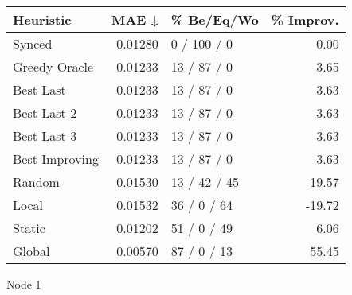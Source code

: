 \begin{tabular}{lrlr}
\toprule
\textbf{Heuristic} & \textbf{MAE ↓} & \textbf{\% Be/Eq/Wo} & \textbf{\% Improv.} \\
\midrule
            Synced &        0.01280 &          0 / 100 / 0 &                0.00 \\
     Greedy Oracle &        0.01233 &          13 / 87 / 0 &                3.65 \\
         Best Last &        0.01233 &          13 / 87 / 0 &                3.63 \\
       Best Last 2 &        0.01233 &          13 / 87 / 0 &                3.63 \\
       Best Last 3 &        0.01233 &          13 / 87 / 0 &                3.63 \\
    Best Improving &        0.01233 &          13 / 87 / 0 &                3.63 \\
            Random &        0.01530 &         13 / 42 / 45 &              -19.57 \\
             Local &        0.01532 &          36 / 0 / 64 &              -19.72 \\
            Static &        0.01202 &          51 / 0 / 49 &                6.06 \\
            Global &        0.00570 &          87 / 0 / 13 &               55.45 \\
\bottomrule
\end{tabular}
\caption{Node 1}
\label{tab:non_lr05_le1_bs4_1}
